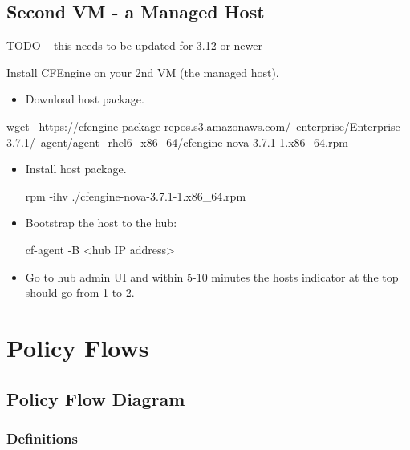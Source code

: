 \subsection{Second VM - a Managed Host}

TODO -- this needs to be updated for 3.12 or newer

Install CFEngine on your 2nd VM (the managed host).

\begin{itemize}
\item{} Download host package.
\end{itemize}

\begin{code}
wget \
https://cfengine-package-repos.s3.amazonaws.com/\
enterprise/Enterprise-3.7.1/\
agent/agent_rhel6_x86_64/cfengine-nova-3.7.1-1.x86_64.rpm
\end{code}





\begin{itemize}
\item{} Install host package.
\begin{code}
rpm -ihv ./cfengine-nova-3.7.1-1.x86_64.rpm
\end{code}
\item{} Bootstrap the host to the hub:
\begin{code}
cf-agent -B <hub IP address>
\end{code}
\item{} Go to hub admin UI and within 5-10 minutes the hosts indicator at the top should go from 1 to 2.
\end{itemize}





\section{Policy Flows}





\subsection{Policy Flow Diagram}

\subsubsection{Definitions}

